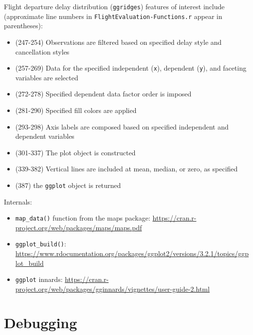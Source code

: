 \documentclass[10pt, letterpaper]{article}
\begin{document}
\begin{spacing}{1.0}
Flight departure delay distribution (\texttt{ggridges}) features of interest include (approximate line numbers in \texttt{FlightEvaluation-Functions.r} appear in parentheses):

\begin{itemize}
  \item (247-254) Observations are filtered based on specified delay style and cancellation styles
  \item (257-269) Data for the specified independent (\texttt{x}), dependent (\texttt{y}), and faceting variables are selected
  \item (272-278) Specified dependent data factor order is imposed
  \item (281-290) Specified fill colors are applied
  \item (293-298) Axis labels are composed based on specified independent and dependent variables
  \item (301-337) The plot object is constructed
  \item (339-382) Vertical lines are included at mean, median, or zero, as specified
  \item (387) the \texttt{ggplot} object is returned
\end{itemize}

Internals:
\begin{itemize}
  \item \texttt{map\_data()} function from the maps package: \url{https://cran.r-project.org/web/packages/maps/maps.pdf}
  \item \texttt{ggplot\_build()}: \url{https://www.rdocumentation.org/packages/ggplot2/versions/3.2.1/topics/ggplot_build}
  \item \texttt{ggplot} innards: \url{https://cran.r-project.org/web/packages/gginnards/vignettes/user-guide-2.html}
\end{itemize}
    

\section{Debugging}\label{sec:debugging}


\end{spacing}
\end{document}
